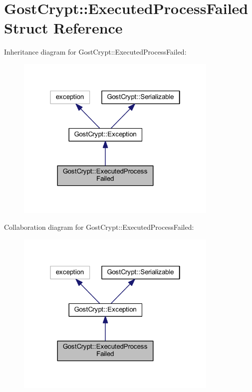\hypertarget{struct_gost_crypt_1_1_executed_process_failed}{}\section{Gost\+Crypt\+:\+:Executed\+Process\+Failed Struct Reference}
\label{struct_gost_crypt_1_1_executed_process_failed}


Inheritance diagram for Gost\+Crypt\+:\+:Executed\+Process\+Failed\+:
\nopagebreak
\begin{figure}[H]
\begin{center}
\leavevmode
\includegraphics[width=274pt]{struct_gost_crypt_1_1_executed_process_failed__inherit__graph}
\end{center}
\end{figure}


Collaboration diagram for Gost\+Crypt\+:\+:Executed\+Process\+Failed\+:
\nopagebreak
\begin{figure}[H]
\begin{center}
\leavevmode
\includegraphics[width=274pt]{struct_gost_crypt_1_1_executed_process_failed__coll__graph}
\end{center}
\end{figure}
